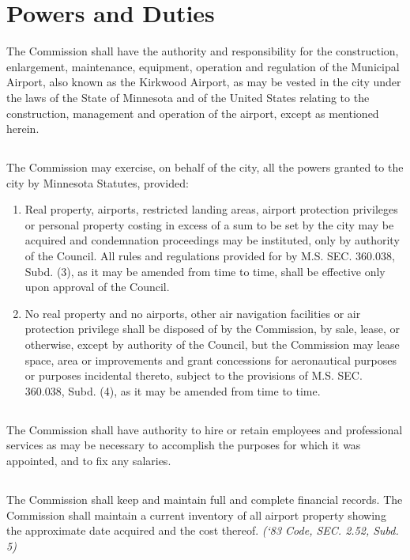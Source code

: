 \section{Powers and Duties}
The Commission shall have the authority and responsibility for the construction, enlargement, maintenance, equipment, operation and regulation of the Municipal Airport, also known as the Kirkwood Airport, as may be vested in the city under the laws of the State of Minnesota and of the United States relating to the construction, management and operation of the airport, except as mentioned herein.
\subsection{}
The Commission may exercise, on behalf of the city, all the powers granted to the city by Minnesota Statutes, provided:
\begin{enumerate}
\item Real property, airports, restricted landing areas, airport protection privileges or personal property costing in excess of a sum to be set by the city may be acquired and condemnation proceedings may be instituted, only by authority of the Council.  All rules and regulations provided for by M.S. SEC. 360.038, Subd. (3), as it may be amended from time to time, shall be effective only upon approval of the Council.
\item No real property and no airports, other air navigation facilities or air protection privilege shall be disposed of by the Commission, by sale, lease, or otherwise, except by authority of the Council, but the Commission may lease space, area or improvements and grant concessions for aeronautical purposes or purposes incidental thereto, subject to the provisions of M.S. SEC. 360.038, Subd. (4), as it may be amended from time to time.
\end{enumerate}
\subsection{}
The Commission shall have authority to hire or retain employees and professional services as may be necessary to accomplish the purposes for which it was appointed, and to fix any salaries.
\subsection{}
The Commission shall keep and maintain full and complete financial records.  The Commission shall maintain a current inventory of all airport property showing the approximate date acquired and the cost thereof.\newline
\emph{(‘83 Code, SEC. 2.52, Subd. 5)}
